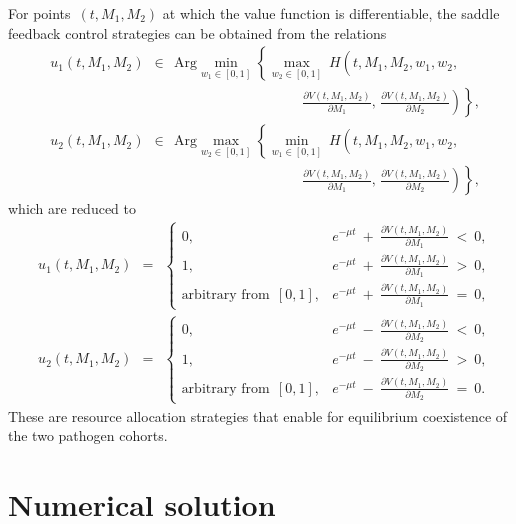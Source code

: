 \documentclass[a4paper,12pt]{article}
\begin{document}
For points~$ (t, M_1, M_2) $ at which the value function is differentiable, the saddle feedback control strategies can be
obtained from the relations
$$
\begin{aligned}
& u_1(t, M_1, M_2) \:\: \in \:\: \mathrm{Arg} \min_{w_1 \in [0, 1]} \left\{ \max_{w_2 \in [0, 1]} \:
H \left( t, M_1, M_2, w_1, w_2, {}^{{}^{{}^{{}^{{}^{}}}}} \right. \right. \\
& \qquad\qquad\qquad\qquad\qquad\qquad\qquad\qquad\qquad
\left. \left. \frac{\partial V(t, M_1, M_2)}{\partial M_1}, \, \frac{\partial V(t, M_1, M_2)}{\partial M_2} \right) \right\}, \\
& u_2(t, M_1, M_2) \:\: \in \:\: \mathrm{Arg} \max_{w_2 \in [0, 1]} \left\{ \min_{w_1 \in [0, 1]} \:
H \left( t, M_1, M_2, w_1, w_2, {}^{{}^{{}^{{}^{{}^{}}}}} \right. \right. \\
& \qquad\qquad\qquad\qquad\qquad\qquad\qquad\qquad\qquad
\left. \left. \frac{\partial V(t, M_1, M_2)}{\partial M_1}, \, \frac{\partial V(t, M_1, M_2)}{\partial M_2} \right) \right\},
\end{aligned}
$$
which are reduced to
\begin{equation}
\begin{aligned}
& u_1(t, M_1, M_2) \:\: = \:\: \begin{cases}
0, & e^{-\mu t} \: + \: \frac{\partial V(t, M_1, M_2)}{\partial M_1} \: < \: 0, \\
1, & e^{-\mu t} \: + \: \frac{\partial V(t, M_1, M_2)}{\partial M_1} \: > \: 0, \\
\mbox{arbitrary from} \:\: [0, 1], & e^{-\mu t} \: + \: \frac{\partial V(t, M_1, M_2)}{\partial M_1} \: = \: 0,
\end{cases} \\
& u_2(t, M_1, M_2) \:\: = \:\: \begin{cases}
0, & e^{-\mu t} \: - \: \frac{\partial V(t, M_1, M_2)}{\partial M_2} \: < \: 0, \\
1, & e^{-\mu t} \: - \: \frac{\partial V(t, M_1, M_2)}{\partial M_2} \: > \: 0, \\
\mbox{arbitrary from} \:\: [0, 1], & e^{-\mu t} \: - \: \frac{\partial V(t, M_1, M_2)}{\partial M_2} \: = \: 0.
\end{cases}
\end{aligned}  \label{16}
\end{equation}
These are resource allocation strategies that enable for equilibrium coexistence of the two pathogen cohorts.


\section{Numerical solution}
\end{document}
